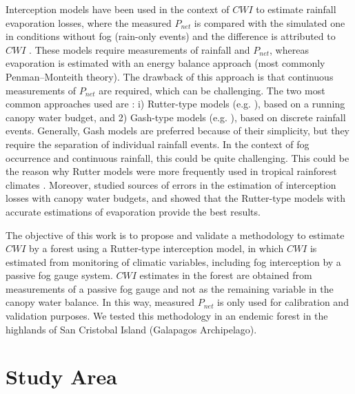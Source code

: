 \documentclass[a4paper,12pt]{article}
\begin{document}
Interception models have been used in the context of $CWI$ to estimate rainfall evaporation losses, where the measured $P_{net}$ is compared with the simulated one in conditions without fog (rain-only events) and the difference is attributed to $CWI$ \citep{Holwerdaetal2010, Pryetetal2012a}. These models require measurements of rainfall and $P_{net}$, whereas evaporation is estimated with an energy balance approach (most commonly Penman–Monteith theory). The drawback of this approach is that continuous measurements of $P_{net}$ are required, which can be challenging. The two most common approaches used are \citep{Muzyloetal2009}:  i) Rutter-type models (e.g. \cite{Liu1997, Rutter1975}), based on a running canopy water budget, and 2) Gash-type models (e.g. \cite{Gash1979, Zengetal2000}), based on discrete rainfall events. Generally, Gash models are preferred because of their simplicity, but they require the separation of individual rainfall events. In the context of fog occurrence and continuous rainfall, this could be quite challenging. This could be the reason why Rutter models were more frequently used in tropical rainforest climates \citep{Muzyloetal2009}. Moreover, \cite{vanDijketal2015} studied sources of errors in the estimation of interception losses with canopy water budgets, and showed that the Rutter-type models with accurate estimations of evaporation provide the best results. 

The objective of this work is to propose and validate a methodology to estimate $CWI$ by a forest using a Rutter-type interception model, in which $CWI$ is estimated from monitoring of climatic variables, including fog interception by a passive fog gauge system. $CWI$ estimates in the forest are obtained from measurements of a passive fog gauge and not as the remaining variable in the canopy water balance. In this way, measured $P_{net}$ is only used for calibration and validation purposes. We tested this methodology in an endemic forest in the highlands of San Cristobal Island (Galapagos Archipelago). 

\section{Study Area}
\end{document}
